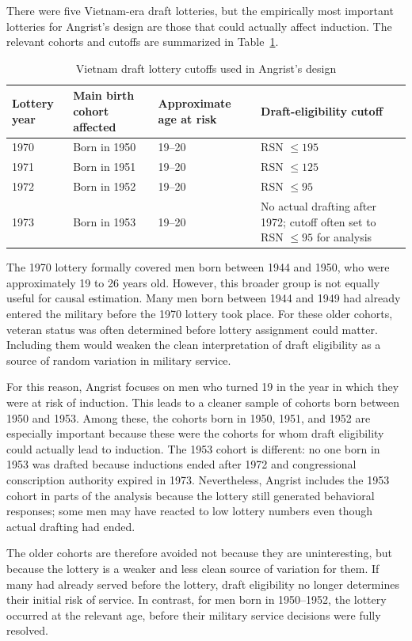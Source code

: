 \documentclass[11pt,a4paper]{article}
\begin{document}
There were five Vietnam-era draft lotteries, but the empirically most important lotteries for Angrist's design are those that could actually affect induction. The relevant cohorts and cutoffs are summarized in Table~\ref{tab:cutoffs}.

\begin{table}[h!]
\centering
\caption{Vietnam draft lottery cutoffs used in Angrist's design}
\label{tab:cutoffs}
\begin{tabular}{llll}
\toprule
Lottery year & Main birth cohort affected & Approximate age at risk & Draft-eligibility cutoff \\
\midrule
1970 & Born in 1950 & 19--20 & RSN $\leq 195$ \\
1971 & Born in 1951 & 19--20 & RSN $\leq 125$ \\
1972 & Born in 1952 & 19--20 & RSN $\leq 95$ \\
1973 & Born in 1953 & 19--20 & No actual drafting after 1972; cutoff often set to RSN $\leq 95$ for analysis \\
\bottomrule
\end{tabular}
\end{table}

The 1970 lottery formally covered men born between 1944 and 1950, who were approximately 19 to 26 years old. However, this broader group is not equally useful for causal estimation. Many men born between 1944 and 1949 had already entered the military before the 1970 lottery took place. For these older cohorts, veteran status was often determined before lottery assignment could matter. Including them would weaken the clean interpretation of draft eligibility as a source of random variation in military service.

For this reason, Angrist focuses on men who turned 19 in the year in which they were at risk of induction. This leads to a cleaner sample of cohorts born between 1950 and 1953. Among these, the cohorts born in 1950, 1951, and 1952 are especially important because these were the cohorts for whom draft eligibility could actually lead to induction. The 1953 cohort is different: no one born in 1953 was drafted because inductions ended after 1972 and congressional conscription authority expired in 1973. Nevertheless, Angrist includes the 1953 cohort in parts of the analysis because the lottery still generated behavioral responses; some men may have reacted to low lottery numbers even though actual drafting had ended.

The older cohorts are therefore avoided not because they are uninteresting, but because the lottery is a weaker and less clean source of variation for them. If many had already served before the lottery, draft eligibility no longer determines their initial risk of service. In contrast, for men born in 1950--1952, the lottery occurred at the relevant age, before their military service decisions were fully resolved.
\end{document}
